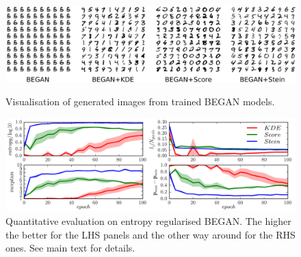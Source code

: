 \begin{figure}[t]
\vspace{-0.2in}
\includegraphics[width=1.0\linewidth]{figs/gan_samples.pdf}
\vspace{-0.2in}
\caption{Visualisation of generated images from trained BEGAN models.}
\label{fig:gan_samples}
\vspace{0.1in}
\includegraphics[width=1.0\linewidth]{figs/gan_results.pdf}
\vspace{-0.2in}
\caption{Quantitative evaluation on entropy regularised BEGAN. The higher the better for the LHS panels and the other way around for the RHS ones. See main text for details.}
\vspace{-0.1in}
\label{fig:gan_results}
\end{figure}
